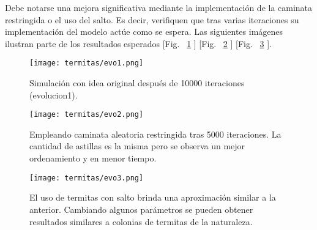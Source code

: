 Debe notarse una mejora significativa mediante la implementación de la caminata restringida o el uso del salto. Es decir, verifiquen que tras varias iteraciones su implementación del modelo actúe como se espera. Las siguientes imágenes ilustran parte de los resultados esperados [Fig. ~\ref{fig:evo1} ] [Fig. ~\ref{fig:evo2} ] [Fig. ~\ref{fig:evo3} ].

\begin{figure}
  \centering
  \texttt{[image: termitas/evo1.png]}
  \caption{Simulación con idea original después de 10000 iteraciones (evolucion1).}
  \label{fig:evo1}
\end{figure}

\begin{figure}
  \centering
  \texttt{[image: termitas/evo2.png]}
  \caption{Empleando caminata aleatoria restringida tras 5000 iteraciones. La cantidad de astillas es la misma pero se observa un mejor ordenamiento y en menor tiempo.}
  \label{fig:evo2}
\end{figure}

\begin{figure}
  \centering
  \texttt{[image: termitas/evo3.png]}
  \caption{El uso de termitas con salto brinda una aproximación similar a la anterior. Cambiando algunos parámetros se pueden obtener resultados similares a colonias de termitas de la naturaleza.}
  \label{fig:evo3}
\end{figure}






